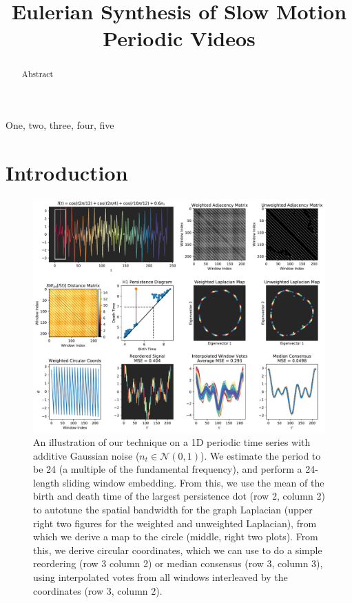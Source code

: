 \documentclass{article}
\title{Eulerian Synthesis of Slow Motion Periodic Videos}
\begin{document}
%
\maketitle
%


\begin{abstract}
Abstract
\end{abstract}
%
\begin{keywords}
One, two, three, four, five
\end{keywords}
%


\section{Introduction}

\begin{figure}[h!]
\centering
\includegraphics[width=\columnwidth]{1DExample.pdf}
\caption{An illustration of our technique on a 1D periodic time series with additive Gaussian noise ($n_t \in \mathcal{N}(0, 1)$).  We estimate the period to be 24 (a multiple of the fundamental frequency), and perform a 24-length sliding window embedding.  From this, we use the mean of the birth and death time of the largest persistence dot (row 2, column 2) to autotune the spatial bandwidth for the graph Laplacian (upper right two figures for the weighted and unweighted Laplacian), from which we derive a map to the circle (middle, right two plots).  From this, we derive circular coordinates, which we can use to do a simple reordering (row 3 column 2) or median consensus (row 3, column 3), using interpolated votes from all windows interleaved by the coordinates (row 3, column 2). }
\label{fig:ConceptFigure}
\end{figure}
\end{document}

